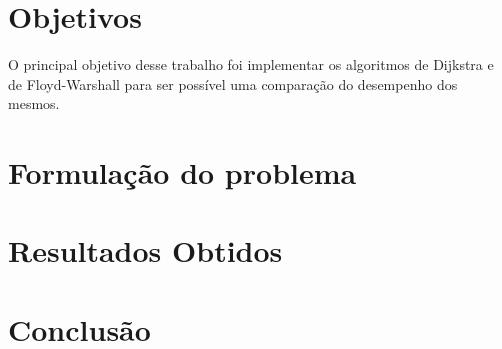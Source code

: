\documentclass[
	12pt,				%
	openright,			%
	oneside,			%
	a4paper,			%
	english,			%
	french,				%
	spanish,			%
	brazil,				%
	]{abntex2}
\begin{document}
\tableofcontents*
\pagebreak




	


\chapter{Objetivos}
O principal objetivo desse trabalho foi implementar os algoritmos de Dijkstra e de Floyd-Warshall para ser possível uma comparação do desempenho dos mesmos.

\chapter{Formulação do problema}
\chapter{Resultados Obtidos}
\chapter{Conclusão}

\cite{algo}
\cite{cardoso2005teoria}
\cite{coelho2013teoria}
\cite{costa2011teoria}
\cite{costalonga2012grafos}
\cite{deteoria}
\cite{feofiloff2011introduccao}



%
\end{document}
